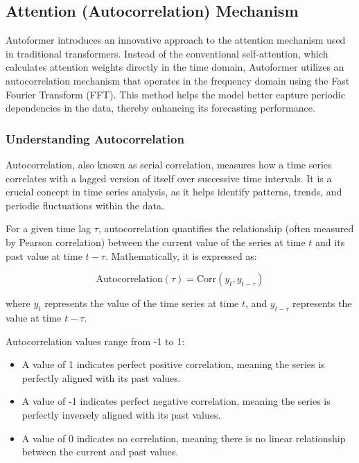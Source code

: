 \subsection{Attention (Autocorrelation) Mechanism}
Autoformer introduces an innovative approach to the attention mechanism used in traditional transformers. Instead of the conventional self-attention, which calculates attention weights directly in the time domain, Autoformer utilizes an autocorrelation mechanism that operates in the frequency domain using the Fast Fourier Transform (FFT). This method helps the model better capture periodic dependencies in the data, thereby enhancing its forecasting performance.

\subsubsection{Understanding Autocorrelation}
Autocorrelation, also known as serial correlation, measures how a time series correlates with a lagged version of itself over successive time intervals. It is a crucial concept in time series analysis, as it helps identify patterns, trends, and periodic fluctuations within the data.

For a given time lag \( \tau \), autocorrelation quantifies the relationship (often measured by Pearson correlation) between the current value of the series at time \( t \) and its past value at time \( t - \tau \). Mathematically, it is expressed as:

\begin{equation}
\text{Autocorrelation}(\tau) = \text{Corr}(y_t, y_{t-\tau})
\end{equation}

where \( y_t \) represents the value of the time series at time \( t \), and \( y_{t-\tau} \) represents the value at time \( t - \tau \).

Autocorrelation values range from -1 to 1:
\begin{itemize}
    \item A value of 1 indicates perfect positive correlation, meaning the series is perfectly aligned with its past values.
    \item A value of -1 indicates perfect negative correlation, meaning the series is perfectly inversely aligned with its past values.
    \item A value of 0 indicates no correlation, meaning there is no linear relationship between the current and past values.
\end{itemize}

